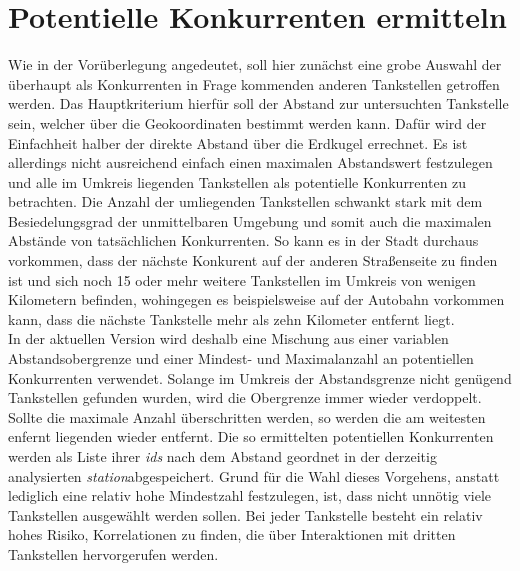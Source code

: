 \section{Potentielle Konkurrenten ermitteln}
Wie in der Vorüberlegung angedeutet, soll hier zunächst eine grobe Auswahl der überhaupt als Konkurrenten in Frage kommenden anderen Tankstellen getroffen werden. Das Hauptkriterium hierfür soll der Abstand zur untersuchten Tankstelle sein, welcher über die Geokoordinaten bestimmt werden kann. Dafür wird der Einfachheit halber der direkte Abstand über die Erdkugel errechnet. Es ist allerdings nicht ausreichend einfach einen maximalen Abstandswert festzulegen und alle im Umkreis liegenden Tankstellen als potentielle Konkurrenten zu betrachten. Die Anzahl der umliegenden Tankstellen schwankt stark mit dem Besiedelungsgrad der unmittelbaren Umgebung und somit auch die maximalen Abstände von tatsächlichen Konkurrenten. So kann es in der Stadt durchaus vorkommen, dass der nächste Konkurent auf der anderen Straßenseite zu finden ist und sich noch 15 oder mehr weitere Tankstellen im Umkreis von wenigen Kilometern befinden, wohingegen es beispielsweise auf der Autobahn vorkommen kann, dass die nächste Tankstelle mehr als zehn Kilometer entfernt liegt.\\
In der aktuellen Version wird deshalb eine Mischung aus einer variablen Abstandsobergrenze und einer Mindest- und Maximalanzahl an potentiellen Konkurrenten verwendet. Solange im Umkreis der Abstandsgrenze nicht genügend Tankstellen gefunden wurden, wird die Obergrenze  immer wieder verdoppelt. Sollte die maximale Anzahl überschritten werden, so werden die am weitesten enfernt liegenden wieder entfernt. Die so ermittelten potentiellen Konkurrenten werden als Liste ihrer \textit{ids} nach dem Abstand geordnet in der derzeitig analysierten \textit{station}abgespeichert. Grund für die Wahl dieses Vorgehens, anstatt lediglich eine relativ hohe Mindestzahl festzulegen, ist, dass nicht unnötig viele Tankstellen ausgewählt werden sollen. Bei jeder Tankstelle besteht ein relativ hohes Risiko, Korrelationen zu finden, die über Interaktionen mit dritten Tankstellen hervorgerufen werden.

